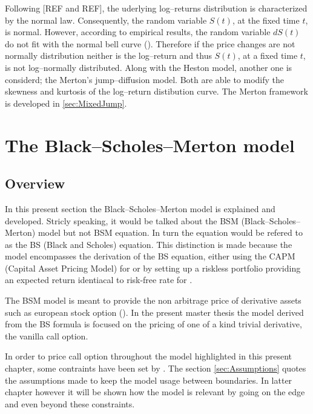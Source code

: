 \documentclass[12pt]{report}
\newcommand{\BSM}{Black--Scholes--Merton }
\newcommand{\St}{S\left(t\right)}
\begin{document}
Following [REF and REF], the uderlying log--returns distribution is characterized by the normal law. Consequently, the random variable $\St$, at the fixed time $t$, is normal. 
However, according to empirical results, the random variable $d\St$ do not fit with the normal bell curve (\citet{clark1973}).
Therefore if the price changes are not normally distribution neither is the log--return and thus $\St$, at a fixed time $t$, is not log--normally distributed.
Along with the Heston model, another one is considerd; the Merton's jump--diffusion model. Both are able to modify the skewness and kurtosis of the log--return distibution curve. The Merton framework is developed in \cref{sec:MixedJump}. 
%
%
\chapter{The \BSM model}
\label{cha:bsm}


\section{Overview}
\label{sec:bsm:overview}

In this present section the Black--Scholes--Merton model is explained and developed. Stricly speaking, it would be talked about the BSM (Black--Scholes--Merton) model but not BSM equation. In turn the equation would be refered to as the BS (Black and Scholes) equation. This distinction is made because the model encompasses the derivation of the BS equation, either using the CAPM (Capital Asset Pricing Model) for \citet{bs} or  by setting up a riskless portfolio providing an expected return identiacal to risk-free rate for \citet{merton73}.

The BSM model is meant to provide the non arbitrage price of derivative assets such as european stock option (\citet{hull}). In the present master thesis the model derived from the BS formula is focused on the pricing of one of a kind trivial derivative, the vanilla call option.

In order to price call option throughout the model highlighted in this present chapter, some contraints have been set by \citet{bs}. 
The section \ref{sec:Assumptions} quotes the assumptions made to keep the model usage between boundaries. In latter chapter however it will be shown how the model is relevant by going on the edge and even beyond these constraints.
\end{document}

